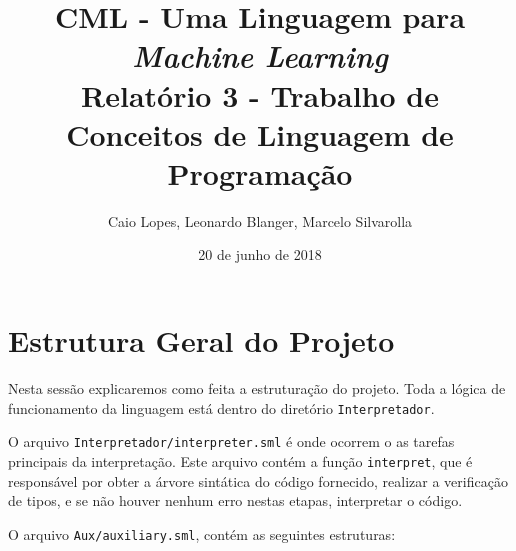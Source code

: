 \documentclass[12pt]{article}
\title{CML - Uma Linguagem para {\it Machine Learning} \\ \Large Relatório 3 - Trabalho de Conceitos de Linguagem de Programação}
\author{Caio Lopes, Leonardo Blanger, Marcelo Silvarolla}
\date{20 de junho de 2018}
\begin{document}
\lstset{
  basicstyle=\ttfamily,
  columns=fullflexible,
  keepspaces=true,
  mathescape
}

\maketitle
\tableofcontents
\newpage
\section{Estrutura Geral do Projeto}

Nesta sessão explicaremos como feita a estruturação do projeto. Toda a lógica de funcionamento da linguagem está dentro do diretório \texttt{Interpretador}.

O arquivo \texttt{Interpretador/interpreter.sml} é onde ocorrem o as tarefas principais da interpretação. Este arquivo contém a função \texttt{interpret}, que é responsável por obter a árvore sintática do código fornecido, realizar a verificação de tipos, e se não houver nenhum erro nestas etapas, interpretar o código.

O arquivo \texttt{Aux/auxiliary.sml}, contém as seguintes estruturas:
\end{document}
